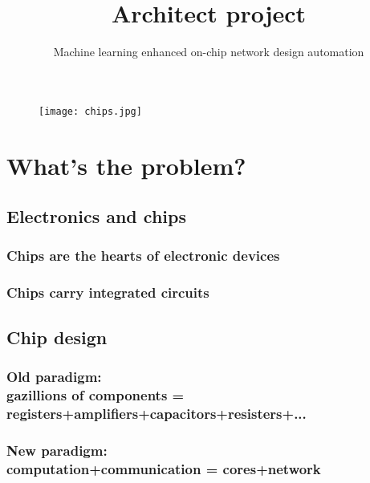 \documentclass[12pt]{article}
\theoremstyle{definition}
\begin{document}
\title{Architect project}
\author{Machine learning enhanced on-chip network design automation}
\maketitle
\begin{figure}[h]
  \centering
      {\texttt{[image: chips.jpg]}}
\end{figure}
\pagebreak

\section{What's the problem?}
\pagebreak

\subsection{Electronics and chips}
\subsubsection{Chips are the hearts of electronic devices}
\subsubsection{Chips carry integrated circuits}
\begin{figure}[h]
  \centering
  \begin{subfigure}
    {\texttt{[image: electronics.jpg]}}
  \end{subfigure}
  \begin{subfigure}
    {\texttt{[image: chip.jpg]}}
  \end{subfigure}
\end{figure}
\pagebreak

\subsection{Chip design}
\subsubsection{Old paradigm: \\ gazillions of components = registers+amplifiers+capacitors+resisters+...}
\subsubsection{New paradigm: \\ computation+communication = cores+network}
\begin{figure}[h]
  \centering
  \begin{subfigure}
    {\texttt{[image: circuits.png]}}
  \end{subfigure}
  \begin{subfigure}
    {\texttt{[image: noc.png]}}
  \end{subfigure}
\end{figure}
\pagebreak
\end{document}
